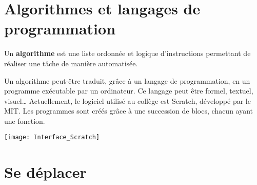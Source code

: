 \cours 

\section{Algorithmes et langages de programmation}

\begin{definition}[Algorithme]
   Un {\bf algorithme} est une liste ordonnée et logique d'instructions permettant de réaliser une tâche de manière automatisée.
\end{definition}

\medskip
 
Un algorithme peut-être traduit, grâce à un langage de programmation, en un programme exécutable par un ordinateur. Ce langage peut être formel, textuel, visuel\dots{} Actuellement, le logiciel utilisé au collège est Scratch, développé par le MIT. Les programmes sont créés grâce à une succession de blocs, chacun ayant une fonction.
\begin{center}
   \texttt{[image: Interface\_Scratch]}
\end{center}


\section{Se déplacer}

